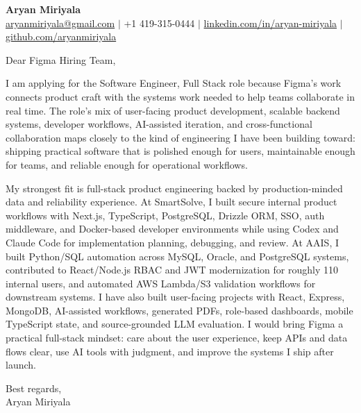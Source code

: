 \documentclass[11pt]{letter}
\begin{document}
\begin{center}
{\Large \textbf{Aryan Miriyala}}\\
\href{mailto:aryanmiriyala@gmail.com}{aryanmiriyala@gmail.com} $|$ +1 419-315-0444 $|$
\href{https://www.linkedin.com/in/aryan-miriyala-7788a21b6/}{linkedin.com/in/aryan-miriyala} $|$
\href{https://github.com/aryanmiriyala}{github.com/aryanmiriyala}
\end{center}

\vspace{0.25in}

Dear Figma Hiring Team,

I am applying for the Software Engineer, Full Stack role because Figma's work connects product craft with the systems work needed to help teams collaborate in real time. The role's mix of user-facing product development, scalable backend systems, developer workflows, AI-assisted iteration, and cross-functional collaboration maps closely to the kind of engineering I have been building toward: shipping practical software that is polished enough for users, maintainable enough for teams, and reliable enough for operational workflows.

My strongest fit is full-stack product engineering backed by production-minded data and reliability experience. At SmartSolve, I built secure internal product workflows with Next.js, TypeScript, PostgreSQL, Drizzle ORM, SSO, auth middleware, and Docker-based developer environments while using Codex and Claude Code for implementation planning, debugging, and review. At AAIS, I built Python/SQL automation across MySQL, Oracle, and PostgreSQL systems, contributed to React/Node.js RBAC and JWT modernization for roughly 110 internal users, and automated AWS Lambda/S3 validation workflows for downstream systems. I have also built user-facing projects with React, Express, MongoDB, AI-assisted workflows, generated PDFs, role-based dashboards, mobile TypeScript state, and source-grounded LLM evaluation. I would bring Figma a practical full-stack mindset: care about the user experience, keep APIs and data flows clear, use AI tools with judgment, and improve the systems I ship after launch.

\vspace{0.15in}

Best regards,\\
Aryan Miriyala
\end{document}
